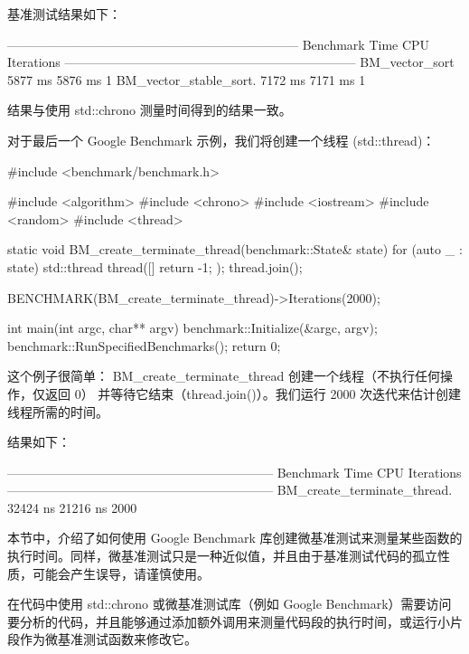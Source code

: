 基准测试结果如下：

\begin{shell}
---------------------------------------------------------------------
Benchmark                       Time             CPU       Iterations
---------------------------------------------------------------------
BM_vector_sort               5877 ms         5876 ms                1
BM_vector_stable_sort.       7172 ms         7171 ms                1
\end{shell}

结果与使用 std::chrono 测量时间得到的结果一致。

对于最后一个 Google Benchmark 示例，我们将创建一个线程 (std::thread)：

\begin{cpp}
#include <benchmark/benchmark.h>

#include <algorithm>
#include <chrono>
#include <iostream>
#include <random>
#include <thread>

static void BM_create_terminate_thread(benchmark::State& state) {
    for (auto _ : state) {
        std::thread thread([]{ return -1; });
        thread.join();
    }
}

BENCHMARK(BM_create_terminate_thread)->Iterations(2000);

int main(int argc, char** argv) {
    benchmark::Initialize(&argc, argv);
    benchmark::RunSpecifiedBenchmarks();
    return 0;
}
\end{cpp}

这个例子很简单： BM\_create\_terminate\_thread 创建一个线程（不执行任何操作，仅返回 0） 并等待它结束（thread.join()）。我们运行 2000 次迭代来估计创建线程所需的时间。

结果如下：

\begin{shell}
---------------------------------------------------------------
Benchmark                       Time        CPU      Iterations
---------------------------------------------------------------
BM_create_terminate_thread. 32424 ns   21216 ns            2000
\end{shell}

本节中，介绍了如何使用 Google Benchmark 库创建微基准测试来测量某些函数的执行时间。同样，微基准测试只是一种近似值，并且由于基准测试代码的孤立性质，可能会产生误导，请谨慎使用。


在代码中使用 std::chrono 或微基准测试库（例如 Google Benchmark）需要访问要分析的代码，并且能够通过添加额外调用来测量代码段的执行时间，或运行小片段作为微基准测试函数来修改它。

